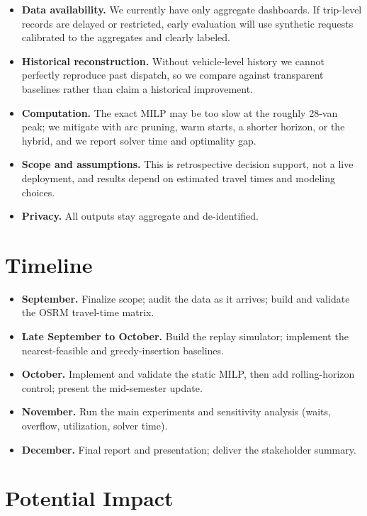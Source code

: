 \documentclass{article}
\begin{document}
\begin{itemize}\setlength\itemsep{1pt}
\item \textbf{Data availability.} We currently have only aggregate dashboards. If trip-level records are delayed or restricted, early evaluation will use synthetic requests calibrated to the aggregates and clearly labeled.
\item \textbf{Historical reconstruction.} Without vehicle-level history we cannot perfectly reproduce past dispatch, so we compare against transparent baselines rather than claim a historical improvement.
\item \textbf{Computation.} The exact MILP may be too slow at the roughly 28-van peak; we mitigate with arc pruning, warm starts, a shorter horizon, or the hybrid, and we report solver time and optimality gap.
\item \textbf{Scope and assumptions.} This is retrospective decision support, not a live deployment, and results depend on estimated travel times and modeling choices.
\item \textbf{Privacy.} All outputs stay aggregate and de-identified.
\end{itemize}

\vskip -0.1in
\section{Timeline}
\vskip -0.1in

\begin{itemize}\setlength\itemsep{1pt}
\item \textbf{September.} Finalize scope; audit the data as it arrives; build and validate the OSRM travel-time matrix.
\item \textbf{Late September to October.} Build the replay simulator; implement the nearest-feasible and greedy-insertion baselines.
\item \textbf{October.} Implement and validate the static MILP, then add rolling-horizon control; present the mid-semester update.
\item \textbf{November.} Run the main experiments and sensitivity analysis (waits, overflow, utilization, solver time).
\item \textbf{December.} Final report and presentation; deliver the stakeholder summary.
\end{itemize}

\vskip -0.1in
\section{Potential Impact}
\vskip -0.1in
\end{document}
